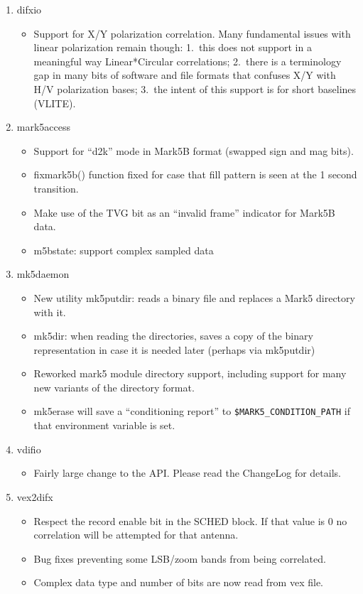 \begin{enumerate}
\item difxio
\begin{itemize}
\item Support for X/Y polarization correlation.  Many fundamental issues with       
  linear polarization remain though: 
1.\ this does not support in a meaningful way Linear*Circular correlations;
2.\ there is a terminology gap in many bits of software and file formats that confuses X/Y with H/V polarization bases;
3.\ the intent of this support is for short baselines (VLITE).
\end{itemize}

\item mark5access
\begin{itemize}
\item Support for ``d2k'' mode in Mark5B format (swapped sign and mag bits).
\item fixmark5b() function fixed for case that fill pattern is seen at the 1 second transition.
\item Make use of the TVG bit as an ``invalid frame'' indicator for Mark5B data.
\item m5bstate: support complex sampled data
\end{itemize}

\item mk5daemon
\begin{itemize}
\item New utility mk5putdir: reads a binary file and replaces a Mark5 directory with it.
\item mk5dir: when reading the directories, saves a copy of the binary representation in case it is needed later (perhaps via mk5putdir)
\item Reworked mark5 module directory support, including support for many new variants of the directory format.
\item mk5erase will save a ``conditioning report'' to {\tt \$MARK5\_CONDITION\_PATH} if that environment variable is set.
\end{itemize}

\item vdifio
\begin{itemize}
\item Fairly large change to the API.  Please read the ChangeLog for details.
\end{itemize}

\item vex2difx
\begin{itemize}
\item Respect the record enable bit in the SCHED block.  If that value is 0 no correlation will be attempted for that antenna.
\item Bug fixes preventing some LSB/zoom bands from being correlated.
\item Complex data type and number of bits are now read from vex file.
\end{itemize}

\end{enumerate}

